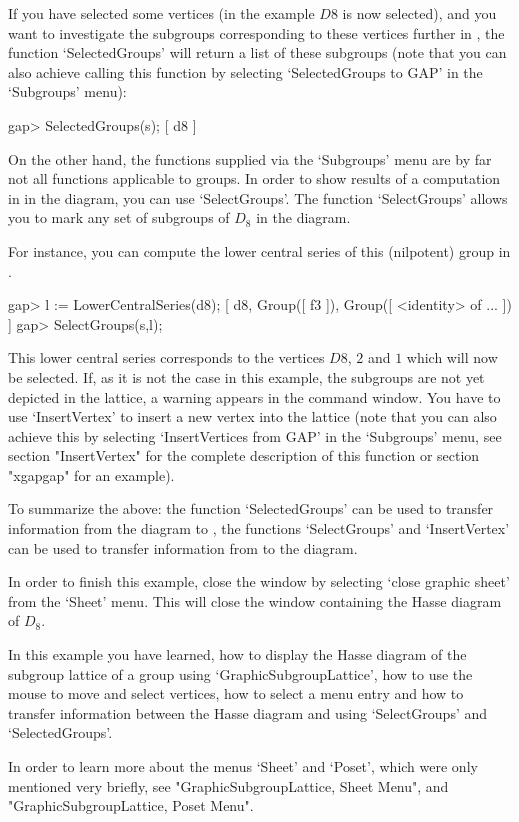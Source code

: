 If you  have  selected  some  vertices (in  the   example $D8$ is  now
selected), and you want to investigate  the subgroups corresponding to
these vertices further  in {\GAP}, the function  `SelectedGroups' will
return a list of  these  subgroups (note  that  you can also   achieve
calling this function by  selecting  `SelectedGroups to GAP' in  the
`Subgroups' menu):

\label{gapxgap}
\begintt
gap> SelectedGroups(s);
[ d8 ]
\endtt

On the other hand, the functions supplied via the `Subgroups' menu are by
far not all functions applicable to groups.  In order to show results of a
computation in {\GAP} in the diagram, you can use `SelectGroups'.  The
function `SelectGroups' allows you to mark any set of subgroups of $D_8$ in
the diagram.

For instance,  you can compute the lower central series of this (nilpotent)
group in {\GAP}.

\begintt
gap> l := LowerCentralSeries(d8);
[ d8, Group([ f3 ]), Group([ <identity> of ... ]) ]
gap> SelectGroups(s,l);
\endtt

This lower central series corresponds to the vertices $D8$, $2$ and
$1$ which will now be selected.  If, as it is not the case in this
example, the subgroups are not yet depicted in the lattice, a warning
appears in the {\GAP} command window. You have to use `InsertVertex'
to insert a new vertex into the lattice (note that you can also
achieve this by selecting `InsertVertices from GAP' in the
`Subgroups' menu, see section "InsertVertex" for the complete
description of this function or section "xgapgap" for an example).

To  summarize the above: the  function `SelectedGroups' can be used to
transfer information  from   the  diagram  to  {\GAP}, the   functions
`SelectGroups' and `InsertVertex' can  be used to transfer information
from {\GAP} to the diagram.

In order to finish this example, close the window by selecting `close
graphic sheet' from the `Sheet' menu.  This will close the window
containing the Hasse diagram of $D_8$.

In this example you have learned, how to display the Hasse diagram of the
subgroup lattice of a group using `GraphicSubgroupLattice', how to use the
mouse to move and select vertices, how to select a menu entry and how to
transfer information between the Hasse diagram and {\GAP} using `SelectGroups'
and `SelectedGroups'.

In order to learn more about the menus `Sheet' and `Poset', which were only
mentioned very briefly, see "GraphicSubgroupLattice, Sheet Menu", and
"GraphicSubgroupLattice, Poset Menu".  

